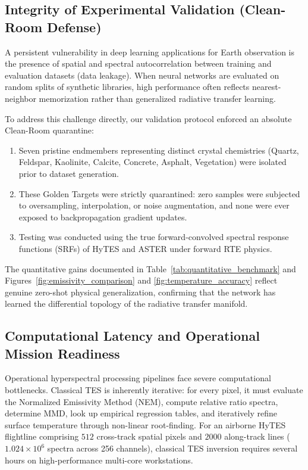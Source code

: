 \documentclass[journal]{IEEEtran}
\begin{document}
\subsection{Integrity of Experimental Validation (Clean-Room Defense)}
A persistent vulnerability in deep learning applications for Earth observation is the presence of spatial and spectral autocorrelation between training and evaluation datasets (data leakage). When neural networks are evaluated on random splits of synthetic libraries, high performance often reflects nearest-neighbor memorization rather than generalized radiative transfer learning.

To address this challenge directly, our validation protocol enforced an absolute Clean-Room quarantine:
\begin{enumerate}
    \item Seven pristine endmembers representing distinct crystal chemistries (Quartz, Feldspar, Kaolinite, Calcite, Concrete, Asphalt, Vegetation) were isolated prior to dataset generation.
    \item These Golden Targets were strictly quarantined: zero samples were subjected to oversampling, interpolation, or noise augmentation, and none were ever exposed to backpropagation gradient updates.
    \item Testing was conducted using the true forward-convolved spectral response functions (SRFs) of HyTES and ASTER under forward RTE physics.
\end{enumerate}
The quantitative gains documented in Table~\ref{tab:quantitative_benchmark} and Figures~\ref{fig:emissivity_comparison} and \ref{fig:temperature_accuracy} reflect genuine zero-shot physical generalization, confirming that the network has learned the differential topology of the radiative transfer manifold.

\subsection{Computational Latency and Operational Mission Readiness}
Operational hyperspectral processing pipelines face severe computational bottlenecks. Classical TES is inherently iterative: for every pixel, it must evaluate the Normalized Emissivity Method (NEM), compute relative ratio spectra, determine $\text{MMD}$, look up empirical regression tables, and iteratively refine surface temperature through non-linear root-finding. For an airborne HyTES flightline comprising $512$ cross-track spatial pixels and $2000$ along-track lines ($1.024 \times 10^6$ spectra across 256 channels), classical TES inversion requires several hours on high-performance multi-core workstations.
\end{document}
